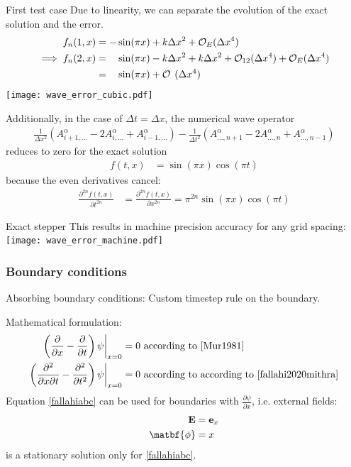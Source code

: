 \documentclass[5pt]{beamer}
\begin{document}
\begin{frame}
  {\huge First test case}
  Due to linearity, we can separate the evolution of the exact solution and the error.
  \begin{align*}
  f_n(1, x) &= -\sin(\pi x) + k\Delta x^2 + \mathcal{O}_E(\Delta x^4) \\
  \implies f_n(2, x) &= \hphantom{-} \sin(\pi x) - k\Delta x^2 + k\Delta x^2 + \mathcal{O}_{12}(\Delta x^4) + \mathcal{O}_E(\Delta x^4) \\
                     &= \hphantom{-} \sin(\pi x) + \mathcal{O}_{\hphantom{1}}(\Delta x^4) 
  \end{align*}
  \pause
  \texttt{[image: wave\_error\_cubic.pdf]}
\end{frame}
\begin{frame}
  Additionally, in the case of $\Delta t = \Delta x$, the numerical wave operator
  \begin{align*}
  \frac{1}{\Delta x^2}\left(A^\alpha_{i+1,...} - 2 A^\alpha_{i,...} + A^\alpha_{i-1,...}\right) - \frac{1}{\Delta t^2}\left(A^\alpha_{...,n+1} - 2 A^\alpha_{...,n} + A^\alpha_{...,n-1}\right)
  \end{align*}
  reduces to zero for the exact solution
  \begin{align*}
    f(t, x) &= \sin(\pi x)\cos(\pi t)
  \end{align*}
  \pause
  because the even derivatives cancel:
  \begin{align*}
    \frac{\partial ^ {2n}f(t, x)}{\partial t^{2n}} &= \frac{\partial ^ {2n}f(t, x)}{\partial x^{2n}} = \pi ^ {2n}\sin(\pi x)\cos(\pi t)
  \end{align*}
\end{frame}
\begin{frame}
  {\huge Exact stepper}
  This results in machine precision accuracy for any grid spacing:
  \texttt{[image: wave\_error\_machine.pdf]}
\end{frame}
\begin{frame}
\frametitle{Boundary conditions}
Absorbing boundary conditions: Custom timestep rule on the boundary.

\vspace{1em}
Mathematical formulation:
\begin{align}
\left(\frac{\partial}{\partial x} - \frac{\partial}{\partial t}\right)\psi\bigg\rvert_{x = 0} &= 0 \text{ according to \cite{Mur1981}} \\
\vspace{2cm}\left(\frac{\partial^2}{\partial x \partial t} - \frac{\partial^2}{\partial t^2}\right)\psi\bigg\rvert_{x = 0} &= 0 \text{ according to according to \cite{fallahi2020mithra}} \label{fallahiabc}
\end{align}
\pause
Equation \ref{fallahiabc} can be used for boundaries with $\frac{\partial \psi}{\partial x}$, i.e. external fields:
\begin{align*}
\mathbf{E} &= \mathbf{e}_x \\
\matbf{\phi} &= x
\end{align*}
is a stationary solution only for \ref{fallahiabc}.
\end{frame}
\end{document}
